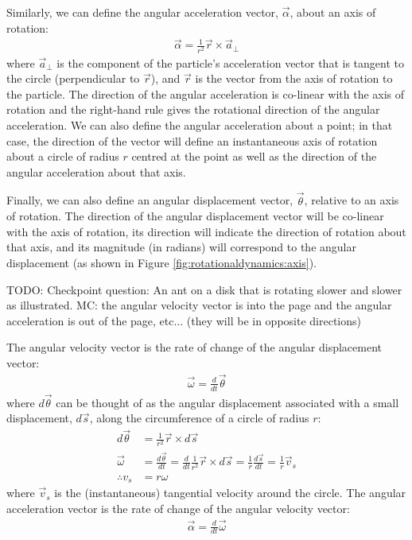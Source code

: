 Similarly, we can define the angular acceleration vector, $\vec \alpha$, about an axis of rotation:
\begin{align}
\vec \alpha = \frac{1}{r^2}\vec r \times \vec a_\perp
\end{align}
where $\vec a_\perp$ is the component of the particle's acceleration vector that is tangent to the circle (perpendicular to $\vec r$),  and $\vec r$ is the vector from the axis of rotation to the particle. The direction of the angular acceleration is co-linear with the axis of rotation and the right-hand rule gives the rotational direction of the angular acceleration. We can also define the angular acceleration about a point; in that case, the direction of the vector will define an instantaneous axis of rotation about a circle of radius $r$ centred at the point as well as the direction of the angular acceleration about that axis.

Finally, we can also define an angular displacement vector, $\vec \theta$, relative to an axis of rotation. The direction of the angular displacement vector will be co-linear with the axis of rotation, its direction will indicate the direction of rotation about that axis, and its magnitude (in radians) will correspond to the angular displacement (as shown in Figure \ref{fig:rotationaldynamics:axis}).

TODO: Checkpoint question: An ant on a disk that is rotating slower and slower as illustrated. MC: the angular velocity vector is into the page and the angular acceleration is out of the page, etc... (they will be in opposite directions) 


The angular velocity vector is the rate of change of the angular displacement vector:
\begin{align*}
\vec\omega = \frac{d}{dt} \vec \theta
\end{align*}
where $d\vec\theta$ can be thought of as the angular displacement associated with a small displacement, $d\vec s$, along the circumference of a circle of radius $r$:
\begin{align*}
d\vec \theta &= \frac{1}{r^2} \vec r \times d\vec s\\
\vec\omega &= \frac{d\vec \theta}{dt}  = \frac{d}{dt} \frac{1}{r^2} \vec r \times d\vec s = \frac{1}{r} \frac{d\vec s}{dt} = \frac{1}{r}\vec v_s\\
\therefore v_s &= r\omega
\end{align*}
where $\vec v_s$ is the (instantaneous) tangential velocity around the circle. The angular acceleration vector is the rate of change of the angular velocity vector:
\begin{align*}
\vec\alpha = \frac{d}{dt} \vec \omega
\end{align*}

